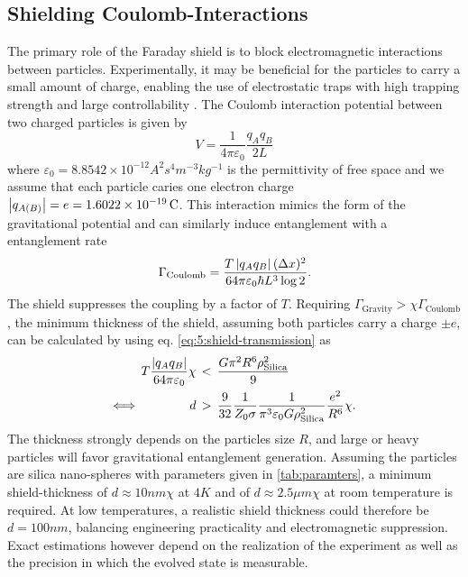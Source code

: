 \subsection{Shielding Coulomb-Interactions}
The primary role of the Faraday shield is to block electromagnetic interactions between particles.
Experimentally, it may be beneficial for the particles to carry a small amount of charge, enabling the use of electrostatic traps with high trapping strength and large controllability \cite{GonzalezBallestero_2021}. 
The Coulomb interaction potential between two charged particles is given by
\begin{equation}
  V = \frac{1}{4\pi\varepsilon_0} \frac{q_A q_B}{2L}
\end{equation}
where $\varepsilon_0 = 8.8542\times 10^{-12}\si{A^2 s^4 m^{-3} kg^{-1}}$ is the permittivity of free space and we assume that each particle caries one electron charge $\left\lvert q_{A(B)}\right\rvert = e = 1.6022\times 10^{-19}\, \mathrm{C}$.
This interaction mimics the form of the gravitational potential and can similarly induce entanglement with a entanglement rate
\begin{equation}\label{eq:5:entanglement-rate-coulomb}
  \Gamma_\mathrm{Coulomb} = \frac{T \left\lvert q_A q_B\right\rvert (\Delta x)^2}{64 \pi \varepsilon_0 \hbar L^3 \log 2} .
\end{equation}
The shield suppresses the coupling by a factor of $T$.
Requiring $\Gamma_\mathrm{Gravity} > \chi \Gamma_\mathrm{Coulomb}$, the minimum thickness of the shield, assuming both particles carry a charge $\pm e$, can be calculated by using eq. \eqref{eq:5:shield-transmission} as
\begin{align}\label{eq:5:coulomb-gravity-condition}
  T \frac{\left\lvert q_A q_B\right\rvert}{64 \pi \varepsilon_0} \chi \, &< \, \frac{G \pi^2 R^6 \rho_\mathrm{Silica}^2}{9} \\
  \Longleftrightarrow \quad\quad\quad\quad d \, &> \, \frac{9}{32}\frac{1}{Z_0 \sigma} \frac{1}{\pi^3 \varepsilon_0 G \rho_\mathrm{Silica}^2} \frac{e^2}{R^6} \chi .
\end{align}
The thickness strongly depends on the particles size $R$, and large or heavy particles will favor gravitational entanglement generation.
Assuming the particles are silica nano-spheres with parameters given in \cref{tab:paramters}, a minimum shield-thickness of $d \approx 10\si{nm}\chi$ at $4\si{K}$ and of $d \approx 2.5\si{\mu m}\chi$ at room temperature is required.
At low temperatures, a realistic shield thickness could therefore be $d=100\si{nm}$, balancing engineering practicality and electromagnetic suppression.
Exact estimations however depend on the realization of the experiment as well as the precision in which the evolved state is measurable.

